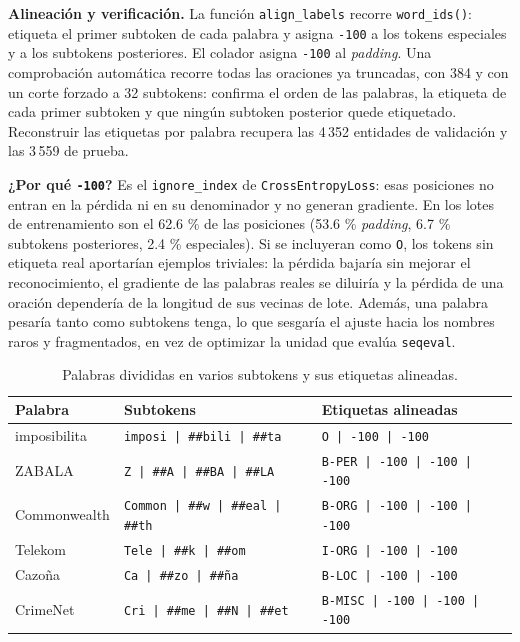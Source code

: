 \documentclass[10pt,a4paper]{article}
\newcommand{\tag}[1]{\texttt{#1}}
\begin{document}
\textbf{Alineación y verificación.} La función \texttt{align\_labels} recorre \texttt{word\_ids()}: etiqueta el primer subtoken de cada palabra y asigna \texttt{-100} a los tokens especiales y a los subtokens posteriores. El colador asigna \texttt{-100} al \textit{padding}. Una comprobación automática recorre todas las oraciones ya truncadas, con 384 y con un corte forzado a 32 subtokens: confirma el orden de las palabras, la etiqueta de cada primer subtoken y que ningún subtoken posterior quede etiquetado. Reconstruir las etiquetas por palabra recupera las 4\,352 entidades de validación y las 3\,559 de prueba.

\textbf{¿Por qué \texttt{-100}?} Es el \texttt{ignore\_index} de \texttt{CrossEntropyLoss}: esas posiciones no entran en la pérdida ni en su denominador y no generan gradiente. En los lotes de entrenamiento son el 62.6 \% de las posiciones (53.6 \% \textit{padding}, 6.7 \% subtokens posteriores, 2.4 \% especiales). Si se incluyeran como \tag{O}, los tokens sin etiqueta real aportarían ejemplos triviales: la pérdida bajaría sin mejorar el reconocimiento, el gradiente de las palabras reales se diluiría y la pérdida de una oración dependería de la longitud de sus vecinas de lote. Además, una palabra pesaría tanto como subtokens tenga, lo que sesgaría el ajuste hacia los nombres raros y fragmentados, en vez de optimizar la unidad que evalúa \texttt{seqeval}.

\begin{table}[H]
\centering\small
\caption{Palabras divididas en varios subtokens y sus etiquetas alineadas.}
\begin{tabular}{lll}
\toprule
Palabra & Subtokens & Etiquetas alineadas \\
\midrule
imposibilita & \texttt{imposi | \#\#bili | \#\#ta} & \tag{O | -100 | -100} \\
ZABALA & \texttt{Z | \#\#A | \#\#BA | \#\#LA} & \tag{B-PER | -100 | -100 | -100} \\
Commonwealth & \texttt{Common | \#\#w | \#\#eal | \#\#th} & \tag{B-ORG | -100 | -100 | -100} \\
Telekom & \texttt{Tele | \#\#k | \#\#om} & \tag{I-ORG | -100 | -100} \\
Cazoña & \texttt{Ca | \#\#zo | \#\#ña} & \tag{B-LOC | -100 | -100} \\
CrimeNet & \texttt{Cri | \#\#me | \#\#N | \#\#et} & \tag{B-MISC | -100 | -100 | -100} \\
\bottomrule
\end{tabular}
\end{table}
\end{document}
